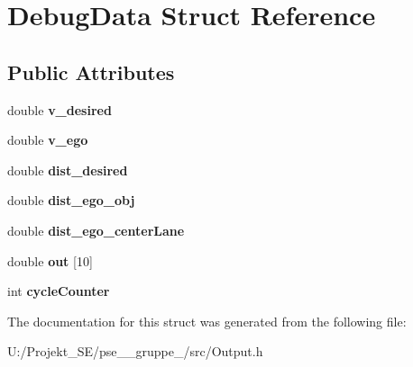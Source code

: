 \hypertarget{struct_debug_data}{}\section{Debug\+Data Struct Reference}
\label{struct_debug_data}
\subsection*{Public Attributes}
\begin{DoxyCompactItemize}
\item 
\mbox{\label{struct_debug_data_ad6be494a9d53a62056701a2ce70b8805}} 
double {\bfseries v\+\_\+desired}
\item 
\mbox{\label{struct_debug_data_a605eb9337d30a7fd302a84123eac2da3}} 
double {\bfseries v\+\_\+ego}
\item 
\mbox{\label{struct_debug_data_ad60eae50bd38e8036b2efc3214ee7f41}} 
double {\bfseries dist\+\_\+desired}
\item 
\mbox{\label{struct_debug_data_a3f2b96cf5768877dfd1b21b9de734e10}} 
double {\bfseries dist\+\_\+ego\+\_\+obj}
\item 
\mbox{\label{struct_debug_data_ad859b5459b0b9e78d62df2479b02e6e7}} 
double {\bfseries dist\+\_\+ego\+\_\+center\+Lane}
\item 
\mbox{\label{struct_debug_data_a77f1a1a237169639f23b498c4704aca6}} 
double {\bfseries out} \mbox{[}10\mbox{]}
\item 
\mbox{\label{struct_debug_data_a38fa997e79bf7fa29ad8d0c795fedce8}} 
int {\bfseries cycle\+Counter}
\end{DoxyCompactItemize}


The documentation for this struct was generated from the following file\+:\begin{DoxyCompactItemize}
\item 
U\+:/\+Projekt\+\_\+\+S\+E/pse\+\_\+\_\+gruppe\+\_/src/Output.\+h\end{DoxyCompactItemize}
